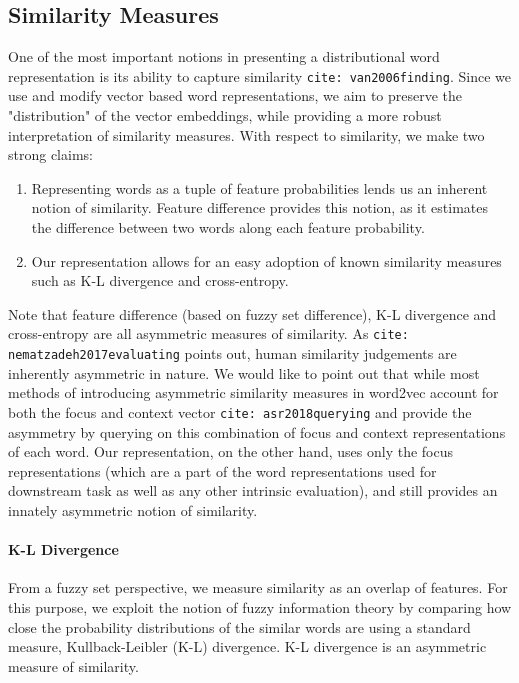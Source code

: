\documentclass{book}
\newcommand{\citep}[1]{\texttt{cite: #1}}
\newcommand{\citet}[1]{\texttt{cite: #1}}
\begin{document}
\subsection{Similarity Measures} \label{ssec: similarity math} One of the most
important notions in presenting a distributional word representation is its
ability to capture similarity \citep{van2006finding}. Since we use and modify
vector based word representations, we aim to preserve the "distribution" of the
vector embeddings, while providing a more robust interpretation of similarity
measures. With respect to similarity, we make two strong claims:
\begin{enumerate} \item Representing words as a tuple of feature probabilities
lends us an inherent notion of similarity. Feature difference provides this
notion, as it estimates the difference between two words along each feature
probability.  \item Our representation allows for an easy adoption of known
similarity measures such as K-L divergence and cross-entropy.  \end{enumerate}

Note that feature difference (based on fuzzy set difference), K-L divergence
and cross-entropy are all asymmetric measures of similarity. As
\citet{nematzadeh2017evaluating} points out, human similarity judgements are
inherently asymmetric in nature. We would like to point out that while most
methods of introducing asymmetric similarity measures in word2vec account for
both the focus and context vector \citet{asr2018querying} and provide the
asymmetry by querying on this combination of focus and context representations
of each word. Our representation, on the other hand, uses only the focus
representations (which are a part of the word representations used for
downstream task as well as any other intrinsic evaluation), and still provides
an innately asymmetric notion of similarity.

\paragraph{K-L Divergence} From a fuzzy set perspective, we measure similarity
as an overlap of features. For this purpose, we exploit the notion of fuzzy
information theory by comparing how close the probability distributions of the
similar words are using a standard measure, Kullback-Leibler (K-L) divergence.
K-L divergence is an asymmetric measure of similarity. 
\end{document}
